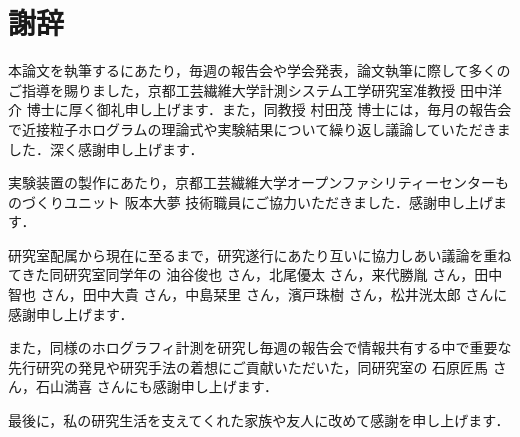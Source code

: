 \documentclass[a4paper,12pt,dvipdfmx, titlepage]{jsarticle_measlab}
\begin{document}

\newpage

\newpage

\newpage

\newpage

\newpage
\section*{謝辞}
本論文を執筆するにあたり，毎週の報告会や学会発表，論文執筆に際して多くのご指導を賜りました，京都工芸繊維大学計測システム工学研究室准教授 田中洋介 博士に厚く御礼申し上げます．また，同教授 村田茂 博士には，毎月の報告会で近接粒子ホログラムの理論式や実験結果について繰り返し議論していただきました．深く感謝申し上げます．

実験装置の製作にあたり，京都工芸繊維大学オープンファシリティーセンターものづくりユニット 阪本大夢 技術職員にご協力いただきました．感謝申し上げます．

研究室配属から現在に至るまで，研究遂行にあたり互いに協力しあい議論を重ねてきた同研究室同学年の 油谷俊也 さん，北尾優太 さん，来代勝胤 さん，田中智也 さん，田中大貴 さん，中島栞里 さん，濱戸珠樹 さん，松井洸太郎 さんに感謝申し上げます．

また，同様のホログラフィ計測を研究し毎週の報告会で情報共有する中で重要な先行研究の発見や研究手法の着想にご貢献いただいた，同研究室の 石原匠馬 さん，石山満喜 さんにも感謝申し上げます．

最後に，私の研究生活を支えてくれた家族や友人に改めて感謝を申し上げます．
\newpage

\newpage

\newpage

\end{document}
